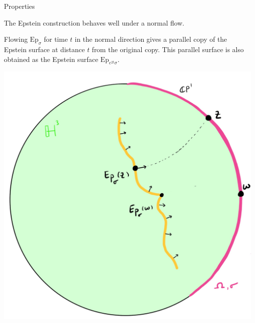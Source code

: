 \documentclass[professionalfont]{beamer}
\begin{document}
\begin{frame}{Properties}

The Epstein construction behaves well under a normal flow. 

Flowing $\mathrm{Ep}_\sigma$ for time $t$ in the normal direction gives a parallel copy of the Epstein surface at distance $t$ from the original copy. This parallel surface is also obtained as the Epstein surface $\mathrm{Ep}_{e^{2t}\sigma}$.

\centering\includegraphics[scale=0.09]{Parallel-7.jpg}

\end{frame}


\end{document}
